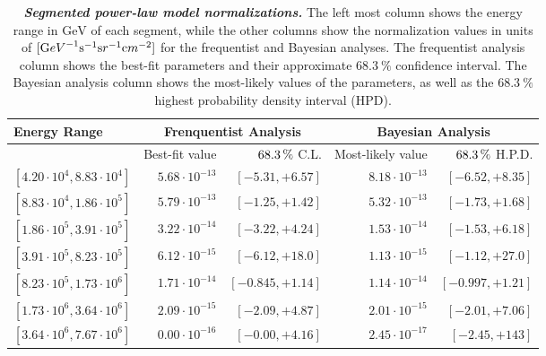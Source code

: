 \begin{table}[thb]
	\centering
	\begin{tabular}{l rr rr}
		Energy Range & \multicolumn{2}{c}{Frenquentist Analysis} & \multicolumn{2}{c}{Bayesian Analysis} \\
		\toprule
		& Best-fit value & $\SI{68.3}\percent$ C.L. & Most-likely value & $\SI{68.3}\percent$ H.P.D. \\
		\midrule
		$[4.20\cdot 10^{4}, 8.83\cdot 10^{4}]$ & $5.68 \cdot 10^{-13}$ & $[-5.31, +6.57]$  & $8.18 \cdot 10^{-13}$ & $[-6.52, +8.35]$  \\
		$[8.83\cdot 10^{4}, 1.86\cdot 10^{5}]$ & $5.79 \cdot 10^{-13}$ & $[-1.25, +1.42]$  & $5.32 \cdot 10^{-13}$ & $[-1.73, +1.68]$  \\
		$[1.86\cdot 10^{5}, 3.91\cdot 10^{5}]$ & $3.22 \cdot 10^{-14}$ & $[-3.22, +4.24]$  & $1.53 \cdot 10^{-14}$ & $[-1.53, +6.18]$  \\
		$[3.91\cdot 10^{5}, 8.23\cdot 10^{5}]$ & $6.12 \cdot 10^{-15}$ & $[-6.12, +18.0]$ & $1.13 \cdot 10^{-15}$ & $[-1.12, +27.0]$  \\
		$[8.23\cdot 10^{5}, 1.73\cdot 10^{6}]$ & $1.71 \cdot 10^{-14}$ & $[-0.845, +1.14]$ & $1.14 \cdot 10^{-14}$ & $[-0.997, +1.21]$ \\
		$[1.73\cdot 10^{6}, 3.64\cdot 10^{6}]$ & $2.09 \cdot 10^{-15}$ & $[-2.09, +4.87]$  & $2.01 \cdot 10^{-15}$ & $[-2.01, +7.06]$  \\
		$[3.64\cdot 10^{6}, 7.67\cdot 10^{6}]$ & $0.00 \cdot 10^{-16}$ & $[-0.00, +4.16]$  & $2.45 \cdot 10^{-17}$ & $[-2.45, +143]$   \\
		\bottomrule
	\end{tabular}
	\internallinenumbers
	\caption{\textbf{\textit{Segmented power-law model normalizations.}}
		The left most column shows the energy range in $\si\GeV$ of each segment, while the other columns show the normalization values in units of $[{\textrm GeV}^{-1} {\textrm s}^{-1} {\textrm sr}^{-1} {\textrm cm}^{-2}]$ for the frequentist and Bayesian analyses.
		The frequentist analysis column shows the best-fit parameters and their approximate $\SI{68.3}\percent$ confidence interval.
		The Bayesian analysis column shows the most-likely values of the parameters, as well as the $\SI{68.3}\percent$ highest probability density interval (HPD).}
	\label{tbl:segment_normalizations}
\end{table}

